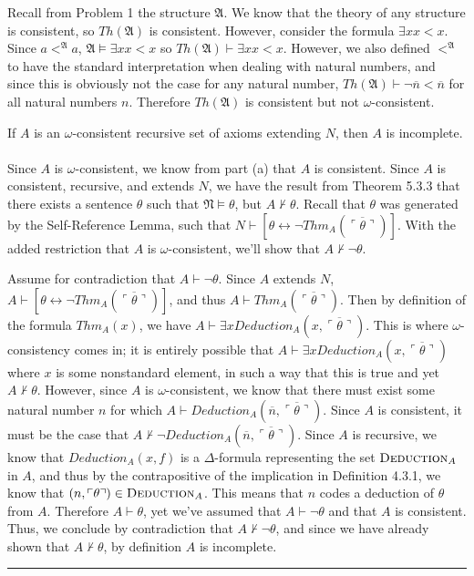 \documentclass[11pt]{hmcpset}
\newenvironment{problem2}[1]{\noindent {\bf (#1}}
{\medskip}
\newenvironment{proof}{\noindent {\bf Proof:} \\}{\hfill
\rule{1mm}{3mm} \bigskip}
\begin{document}
\begin{problem2}{b)} Recall from Problem 1 the structure $\mathfrak{A}$. We know that the theory of any structure is consistent, so $Th(\mathfrak{A})$ is consistent. However, consider the formula $\exists x x<x$. Since $a<^\mathfrak{A}a$, $\mathfrak{A}\vDash\exists xx<x$ so $Th(\mathfrak{A})\vdash\exists xx<x$. However, we also defined $<^\mathfrak{A}$ to have the standard interpretation when dealing with natural numbers, and since this is obviously not the case for any natural number, $Th(\mathfrak{A})\vdash\neg\overline{n}<\overline{n}$ for all natural numbers $n$. Therefore $Th(\mathfrak{A})$ is consistent but not $\omega$-consistent.
\end{problem2}

\begin{problem2}{c)} If $A$ is an $\omega$-consistent recursive set of axioms extending $N$, then $A$ is incomplete.\\
\begin{proof}\indent Since $A$ is $\omega$-consistent, we know from part (a) that $A$ is consistent. Since $A$ is consistent, recursive, and extends $N$, we have the result from Theorem 5.3.3 that there exists a sentence $\theta$ such that $\mathfrak{N}\vDash\theta$, but $A\nvdash\theta$. Recall that $\theta$ was generated by the Self-Reference Lemma, such that $N\vdash\left[\theta\longleftrightarrow\neg Thm_A\left(\overline{\ulcorner\theta\urcorner}\right)\right]$. With the added restriction that $A$ is $\omega$-consistent, we'll show that $A\nvdash\neg\theta$.

Assume for contradiction that $A\vdash\neg\theta$. Since $A$ extends $N$, $A\vdash\left[\theta\longleftrightarrow\neg Thm_A\left(\overline{\ulcorner\theta\urcorner}\right)\right]$, and thus $A\vdash Thm_A\left(\overline{\ulcorner\theta\urcorner}\right)$. Then by definition of the formula $Thm_A(x)$, we have $A\vdash \exists x Deduction_A(x,\overline{\ulcorner\theta\urcorner})$. This is where $\omega$-consistency comes in; it is entirely possible that $A\vdash \exists x Deduction_A(x,\overline{\ulcorner\theta\urcorner})$ where $x$ is some nonstandard element, in such a way that this is true and yet $A\nvdash\theta$. However, since $A$ is $\omega$-consistent, we know that there must exist some natural number $n$ for which $A\vdash Deduction_A(\overline{n},\overline{\ulcorner\theta\urcorner})$. Since $A$ is consistent, it must be the case that $A\nvdash \neg Deduction_A(\overline{n},\overline{\ulcorner\theta\urcorner})$. Since $A$ is recursive, we know that $Deduction_A(x,f)$ is a $\Delta$-formula representing the set $ \textsc{Deduction}_A$ in $A$, and thus by the contrapositive of the implication in Definition 4.3.1, we know that $(n,\ulcorner\theta\urcorner) \in\textsc{Deduction}_A$. This means that $n$ codes a deduction of $\theta$ from $A$. Therefore $A\vdash\theta$, yet we've assumed that $A\vdash\neg\theta$ and that $A$ is consistent. Thus, we conclude by contradiction that $A\nvdash\neg\theta$, and since we have already shown that $A\nvdash\theta$, by definition $A$ is incomplete.
\end{proof}
\end{problem2}
\end{document}
